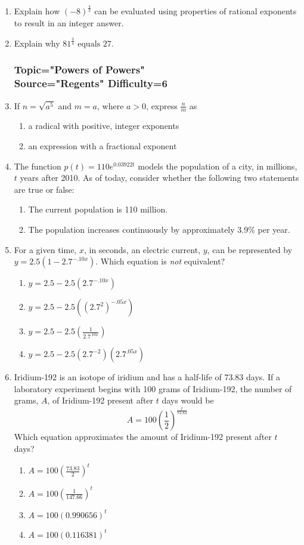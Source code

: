 \documentclass[12pt, oneside]{article}
\begin{document}
\begin{enumerate}
\item Explain how $\displaystyle (-8)^\frac{4}{3}$ can be evaluated using properties of rational exponents to result in an integer answer.
\item Explain why $81^\frac{3}{4} \text{ equals } 27$.

\subsubsection*{Topic="Powers of Powers"\\
Source="Regents" 
Difficulty=6}

\item If $n=\sqrt{a^5}$ and $m=a$, where $a > 0$, express $\frac{n}{m}$ as 
\begin{enumerate}
    \item a radical with positive, integer exponents
    \item an expression with a fractional exponent
\end{enumerate}

\item The function $p(t)=110e^{0.03922t}$ models the population of a city, in millions, $t$ years after 2010. As of today, consider whether the following two statements are true or false:
\begin{enumerate}
    \item The current population is 110 million.
    \item The population increases continuously by approximately 3.9\% per year.
\end{enumerate} %

\item For a given time, $x$, in seconds, an electric current, $y$, can be represented by $y = 2.5(1 - 2.7^{-.10x})$. Which equation is \emph{not} equivalent?
\begin{enumerate}
    \item $y = 2.5 - 2.5 (2.7^{-.10x})$
    \item $y = 2.5 - 2.5 ((2.7^2)^{-.05x})$
    \item $\displaystyle y = 2.5 - 2.5 \left( \frac{1}{2.7^{.10x}} \right)$
    \item $y = 2.5 - 2.5 (2.7^{-2})(2.7^{.05x})$
\end{enumerate}

\item Iridium-192 is an isotope of iridium and has a half-life of 73.83 days. If a laboratory experiment begins with 100 grams of Iridium-192, the number of grams, $A$, of Iridium-192 present after $t$ days would be 
\[A=100 \left( \frac{1}{2} \right)^\frac{t}{73.83}\]
Which equation approximates the amount of Iridium-192 present after $t$ days?
\begin{enumerate}
    \item $\displaystyle A=100 \left( \frac{73.83}{2} \right)^t$
    \item $\displaystyle A=100 \left( \frac{1}{147.66} \right)^t$
    \item $A=100  (0.990656)^t$
    \item $A=100 (0.116381)^t$
\end{enumerate}


\end{enumerate}
\end{document}
